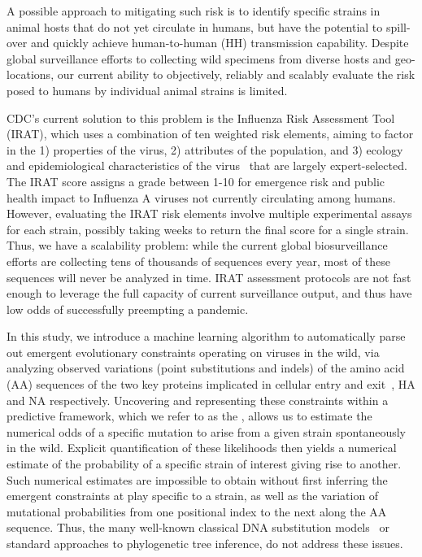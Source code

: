 \documentclass[onecolumn, compsoc,10pt]{IEEEtran}
\begin{document}
A possible approach to mitigating such risk is to identify specific strains in animal hosts that do not yet circulate in humans, but have the potential to spill-over and quickly achieve human-to-human (HH) transmission capability. Despite global surveillance efforts to  collecting wild specimens from diverse hosts and geo-locations, our  current ability to objectively, reliably and scalably  evaluate the risk posed to  humans by  individual animal  strains  is limited.

CDC's current solution to this problem is the Influenza Risk Assessment Tool (IRAT), which  uses a combination of ten weighted risk elements, aiming to factor in the   1) properties of the virus, 2) attributes of the population, and 3) ecology and epidemiological characteristics of the virus~\cite{Influenz24:online} that are largely  expert-selected. The IRAT score assigns  a grade between 1-10 for emergence risk and public health impact to Influenza A viruses not currently circulating among humans. However, evaluating the IRAT risk elements  involve multiple experimental assays for each strain, possibly taking  weeks to return the final   score for a single strain. Thus, we have a scalability problem: while  the current global biosurveillance efforts are collecting tens of thousands of sequences every year, most of these sequences will never be analyzed in time. IRAT assessment protocols are  not fast enough to leverage the full capacity of current surveillance output, and thus have low odds of successfully  preempting a pandemic.

In this study, we introduce a machine learning algorithm to automatically parse out emergent evolutionary constraints operating on \infl viruses in the wild, via analyzing observed variations (point substitutions and indels) of the  amino acid (AA)  sequences  of the two key proteins implicated  in cellular entry and exit~\cite{gamblin2010influenza}, HA and NA respectively. Uncovering and representing these constraints within a predictive framework, which we refer to as the \enet, allows us to estimate the numerical odds of a specific mutation to arise from a given strain  spontaneously in the wild. Explicit quantification of these likelihoods then yields a numerical estimate of the probability of a specific strain of interest giving rise to another. Such numerical estimates are impossible to obtain without first inferring the emergent constraints at play specific to a strain,  as well as  the variation of mutational probabilities from one positional index to the next along the AA sequence. Thus, the many well-known classical  DNA  substitution models~\cite{posada1998modeltest} or standard approaches to phylogenetic tree inference, do not address these issues. 
\end{document}
